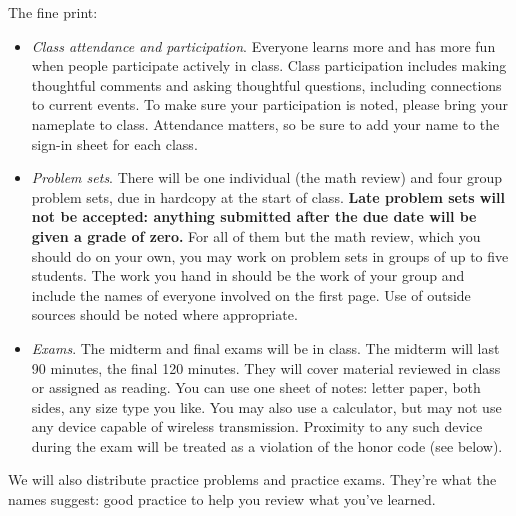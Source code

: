 \documentclass[12pt]{article}
\begin{document}
The fine print:
\begin{itemize}

\item \textit{Class attendance and participation}.
Everyone learns more and has more fun when people participate
actively in class.
Class participation includes making thoughtful comments
and asking thoughtful questions,
including connections to current events.
To make sure your participation is noted, please
bring your nameplate to class.
Attendance matters, so be sure to add your name to the
sign-in sheet for each class.

\item \textit{Problem sets}.
There will be one individual (the math review)
and four group problem sets,
due in hardcopy at the start of class.
{\bf Late problem sets will not be accepted:  
anything submitted after the due date will be given a grade of zero.}  
For all of them but the math review,
which you should do on your own,
you may work on problem sets in groups of up to five students.
The work you hand in should be the work of your group
and include the names of everyone involved on the first page.
Use of outside sources should be noted where appropriate.


\item \textit{Exams}.
The midterm and final exams will be in class.
The midterm will last 90 minutes, the final 120 minutes.
They will cover material reviewed in class or assigned as reading.
You can use one sheet of notes: letter paper, both sides, any size type you like.
You may also use a calculator, but may not use any device
capable of wireless transmission.  Proximity to any such
device during the exam will be treated as a violation of the honor
code (see below).


\end{itemize}

We will also distribute practice problems
and practice exams.
They're what the names suggest:  good practice
to help you review what you've learned.
\end{document}
